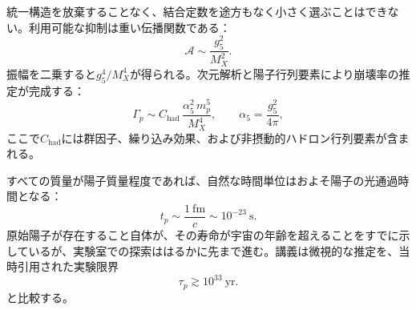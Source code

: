 \begin{classroomqa}
\end{classroomqa}

統一構造を放棄することなく、結合定数を途方もなく小さく選ぶことはできない。利用可能な抑制は重い伝播関数である：
\begin{equation}
\mathcal A
\sim
\frac{g_5^2}{M_X^2}.
\label{eq:l10-amplitude}
\end{equation}
振幅を二乗すると\(g_5^4/M_X^4\)が得られる。次元解析と陽子行列要素により崩壊率の推定が完成する：
\begin{equation}
\Gamma_p
\sim
C_{\mathrm{had}}\,
\frac{\alpha_5^2\,m_p^5}{M_X^4},
\qquad
\alpha_5=\frac{g_5^2}{4\pi},
\label{eq:l10-rate}
\end{equation}
ここで\(C_{\mathrm{had}}\)には群因子、繰り込み効果、および非摂動的ハドロン行列要素が含まれる。


\begin{classroomqa}
\end{classroomqa}

すべての質量が陽子質量程度であれば、自然な時間単位はおよそ陽子の光通過時間となる：
\begin{equation}
t_p\sim\frac{1\ \mathrm{fm}}{c}\sim10^{-23}\ \mathrm{s}.
\label{eq:l10-proton-time}
\end{equation}
原始陽子が存在すること自体が、その寿命が宇宙の年齢を超えることをすでに示しているが、実験室での探索ははるかに先まで進む。講義は微視的な推定を、当時引用された実験限界
\begin{equation}
\tau_p\gtrsim10^{33}\ \mathrm{yr}.
\label{eq:l10-lifetime-bound}
\end{equation}
と比較する。

